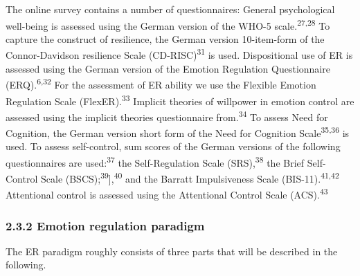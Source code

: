 \documentclass[
  english,
  man,floatsintext]{apa6}
\begin{document}
The online survey contains a number of questionnaires: General psychological well-being is assessed using the German version of the WHO-5 scale.\textsuperscript{27,28}
To capture the construct of resilience, the German version 10-item-form of the Connor-Davidson resilience Scale (CD-RISC)\textsuperscript{31} is used.
Dispositional use of ER is assessed using the German version of the Emotion Regulation Questionnaire (ERQ).\textsuperscript{6,32}
For the assessment of ER ability we use the Flexible Emotion Regulation Scale (FlexER).\textsuperscript{33}
Implicit theories of willpower in emotion control are assessed using the implicit theories questionnaire from.\textsuperscript{34}
To assess Need for Cognition, the German version short form of the Need for Cognition Scale\textsuperscript{35,36} is used.
To assess self-control, sum scores of the German versions of the following questionnaires are used:\textsuperscript{37} the Self-Regulation Scale (SRS),\textsuperscript{38} the Brief Self-Control Scale (BSCS);\textsuperscript{39}{]},\textsuperscript{40} and the Barratt Impulsiveness Scale (BIS-11).\textsuperscript{41,42}
Attentional control is assessed using the Attentional Control Scale (ACS).\textsuperscript{43}

\hypertarget{emotion-regulation-paradigm}{%
\subsubsection{2.3.2 Emotion regulation paradigm}\label{emotion-regulation-paradigm}}

The ER paradigm roughly consists of three parts that will be described in the following.
\end{document}

